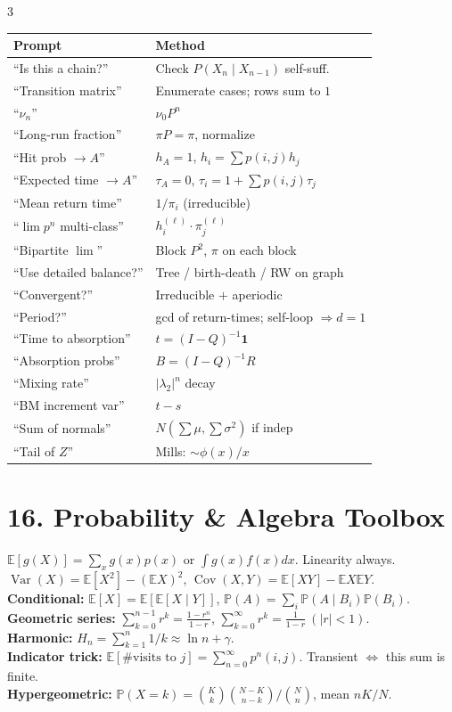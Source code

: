 \documentclass[8pt]{extarticle}
\newcommand{\E}{\mathbb{E}}
\newcommand{\PR}{\mathbb{P}}
\newcommand{\Var}{\operatorname{Var}}
\newcommand{\Cov}{\operatorname{Cov}}
\renewcommand{\b}[1]{\mathbf{#1}}
\begin{document}
\begin{multicols*}{3}
		\begin{tabular}{@{}p{}p{}@{}}
			\textbf{Prompt} & \textbf{Method}\\
			\hline
			``Is this a chain?'' & Check $P(X_n\mid X_{n-1})$ self-suff.\\
			``Transition matrix'' & Enumerate cases; rows sum to $1$\\
			``$\nu_n$'' & $\nu_0 P^n$\\
			``Long-run fraction'' & $\pi P=\pi$, normalize\\
			``Hit prob $\to A$'' & $h_A=1$, $h_i=\sum p(i,j)h_j$\\
			``Expected time $\to A$'' & $\tau_A=0$, $\tau_i=1+\sum p(i,j)\tau_j$\\
			``Mean return time'' & $1/\pi_i$ (irreducible)\\
			``$\lim p^n$ multi-class'' & $h^{(\ell)}_i\cdot\pi^{(\ell)}_j$\\
			``Bipartite $\lim$'' & Block $P^2$, $\pi$ on each block\\
			``Use detailed balance?'' & Tree / birth-death / RW on graph\\
			``Convergent?'' & Irreducible $+$ aperiodic\\
			``Period?'' & gcd of return-times; self-loop $\Rightarrow d=1$\\
			``Time to absorption'' & $t=(I-Q)^{-1}\b 1$\\
			``Absorption probs'' & $B=(I-Q)^{-1}R$\\
			``Mixing rate'' & $|\lambda_2|^n$ decay\\
			``BM increment var'' & $t-s$\\
			``Sum of normals'' & $N(\sum\mu,\sum\sigma^2)$ if indep\\
			``Tail of $Z$'' & Mills: $\sim\phi(x)/x$\\
		\end{tabular}
		
		\section*{16. Probability \& Algebra Toolbox}
		
		$\E[g(X)]=\sum_x g(x)p(x)$ or $\int g(x)f(x)dx$. Linearity always.\\
		$\Var(X)=\E[X^2]-(\E X)^2$, $\Cov(X,Y)=\E[XY]-\E X\E Y$.\\
		\textbf{Conditional:} $\E[X]=\E[\E[X\mid Y]]$, $\PR(A)=\sum_i\PR(A\mid B_i)\PR(B_i)$.\\
		\textbf{Geometric series:} $\sum_{k=0}^{n-1}r^k=\frac{1-r^n}{1-r}$, $\sum_{k=0}^\infty r^k=\frac{1}{1-r}\ (|r|<1)$.\\
		\textbf{Harmonic:} $H_n=\sum_{k=1}^n 1/k\approx\ln n+\gamma$.\\
		\textbf{Indicator trick:} $\E[\#\text{visits to }j]=\sum_{n=0}^\infty p^n(i,j)$. Transient $\Leftrightarrow$ this sum is finite.\\
		\textbf{Hypergeometric:} $\PR(X=k)=\binom{K}{k}\binom{N-K}{n-k}/\binom{N}{n}$, mean $nK/N$.
		

\end{multicols*}
\end{document}
